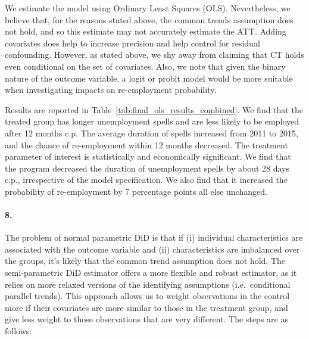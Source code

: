 \documentclass{scrartcl}
\begin{document}
We estimate the model using Ordinary Least Squares (OLS). Nevertheless, we believe that, for the reasons stated above, the common trends assumption does not hold, and so this estimate may not accurately estimate the ATT. Adding covariates does help to increase precision and help control for residual confounding. However, as stated above, we shy away from claiming that CT holds even conditional on the set of covariates. Also, we note that given the binary nature of the outcome variable, a logit or probit model would be more suitable when investigating impacts on re-employment probability.

Results are reported in Table~\ref{tab:final_ols_results_combined}. We find that the treated group has longer unemployment spells and are less likely to be employed after 12 months c.p. The average duration of spells increased from 2011 to 2015, and the chance of re-employment within 12 months decreased. The treatment parameter of interest is statistically and economically significant. We find that the program decreased the duration of unemployment spells by about 28 days c.p., irrespective of the model specification. We also find that it increased the probability of re-employment by 7 percentage points all else unchanged.



\paragraph*{8.} 
The problem of normal parametric DiD is that if (i) individual characteristics are associated with the outcome variable and (ii) characteristics are imbalanced over the groups, it's likely that the common trend assumption does not hold. The semi-parametric DiD estimator offers a more flexible and robust estimator, as it relies on more relaxed versions of the identifying assumptions (i.e.\ conditional parallel trends). This approach allows us to weight observations in the control more if their covariates are more similar to those in the treatment group, and give less weight to those observations that are very different. The steps are as follows:
\end{document}
